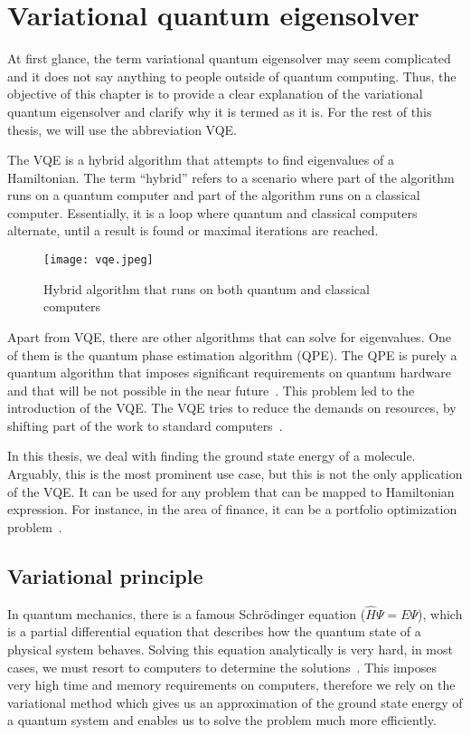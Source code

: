 \chapter{Variational quantum eigensolver}\label{ch:vqe}
At first glance, the term variational quantum eigensolver may seem complicated and it does not say anything to people outside of quantum computing. Thus, the objective of this chapter is to provide a clear explanation of the variational quantum eigensolver and clarify why it is termed as it is. For the rest of this thesis, we will use the abbreviation VQE.

The VQE is a hybrid algorithm that attempts to find eigenvalues of a Hamiltonian. The term ``hybrid'' refers to a scenario where part of the algorithm runs on a quantum computer and part of the algorithm runs on a classical computer. Essentially, it is a loop where quantum and classical computers alternate, until a result is found or maximal iterations are reached.

\begin{figure}[H]
    \centering
    \texttt{[image: vqe.jpeg]}
    \caption{Hybrid algorithm that runs on both quantum and classical computers~\cite{img:hybrid_alg}}
\end{figure}

Apart from VQE, there are other algorithms that can solve for eigenvalues. One of them is the quantum phase estimation algorithm (QPE). The QPE is purely a quantum algorithm that imposes significant requirements on quantum hardware and that will be not possible in the near future~\cite{nisq}. This problem led to the introduction of the VQE. The VQE tries to reduce the demands on resources, by shifting part of the work to standard computers~\cite{vqe_method}.

In this thesis, we deal with finding the ground state energy of a molecule. Arguably, this is the most prominent use case, but this is not the only application of the VQE. It can be used for any problem that can be mapped to Hamiltonian expression. For instance, in the area of finance, it can be a portfolio optimization problem~\cite{portfolio}.

\section{Variational principle}
In quantum mechanics, there is a famous Schrödinger equation ($\hat{H} \Psi = E \Psi$), which is a partial differential equation that describes how the quantum state of a physical system behaves. Solving this equation analytically is very hard, in most cases, we must resort to computers to determine the solutions~\cite{variational}. This imposes very high time and memory requirements on computers, therefore we rely on the variational method which gives us an approximation of the ground state energy of a quantum system and enables us to solve the problem much more efficiently.

